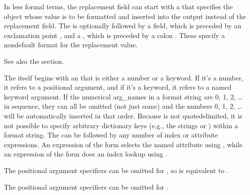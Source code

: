 \documentclass[letterpaper,10pt,english]{sphinxmanual}
\begin{document}
In less formal terms, the replacement field can start with a  that specifies
the object whose value is to be formatted and inserted
into the output instead of the replacement field.
The  is optionally followed by a   field, which is
preceded by an exclamation point \sphinxcode{\sphinxupquote{\textquotesingle{}!\textquotesingle{}}}, and a , which is preceded
by a colon \sphinxcode{\sphinxupquote{\textquotesingle{}:\textquotesingle{}}}.  These specify a non\sphinxhyphen{}default format for the replacement value.

See also the {\hyperref[\detokenize{string:formatspec}]{}} section.

The  itself begins with an  that is either a number or a
keyword.  If it’s a number, it refers to a positional argument, and if it’s a keyword,
it refers to a named keyword argument.  If the numerical arg\_names in a format string
are 0, 1, 2, … in sequence, they can all be omitted (not just some)
and the numbers 0, 1, 2, … will be automatically inserted in that order.
Because  is not quote\sphinxhyphen{}delimited, it is not possible to specify arbitrary
dictionary keys (e.g., the strings \sphinxcode{\sphinxupquote{\textquotesingle{}10\textquotesingle{}}} or \sphinxcode{\sphinxupquote{\textquotesingle{}:\sphinxhyphen{}{]}\textquotesingle{}}}) within a format string.
The  can be followed by any number of index or
attribute expressions. An expression of the form  selects the named
attribute using , while an expression of the form \sphinxcode{\sphinxupquote{\textquotesingle{}{[}index{]}\textquotesingle{}}}
does an index lookup using .

The positional argument specifiers can be omitted for ,
so  is equivalent to .

The positional argument specifiers can be omitted for {\hyperref[\detokenize{string:string.Formatter}]{}}.
\end{document}
